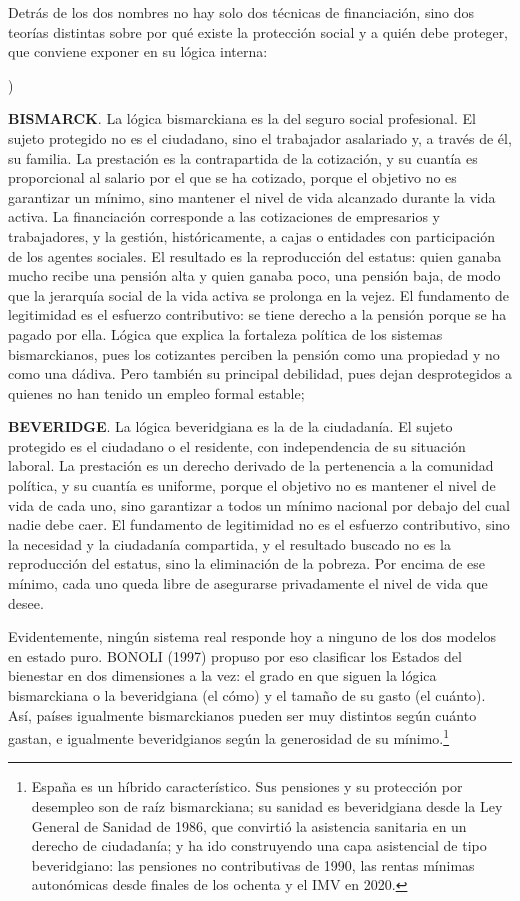 \documentclass[10pt,a4paper]{article}
\newcounter{alphaitem}
\newenvironment{la}
      {\begin{list}{\alph{alphaitem})}{%
          \usecounter{alphaitem}%
          \setlength{\leftmargin}{1cm}%
          \setlength{\parskip}{3pt}%
          \setlength{\itemsep}{0pt}%
          \setlength{\parsep}{0pt}%
      }}
      {\end{list}}
\begin{document}
Detrás de los dos nombres no hay solo dos técnicas de financiación, sino dos teorías distintas sobre por qué existe la protección social y a quién debe proteger, que conviene exponer en su lógica interna:
\begin{la}
    \item \textbf{BISMARCK}. La lógica bismarckiana es la del seguro social profesional. El sujeto protegido no es el ciudadano, sino el trabajador asalariado y, a través de él, su familia. La prestación es la contrapartida de la cotización, y su cuantía es proporcional al salario por el que se ha cotizado, porque el objetivo no es garantizar un mínimo, sino mantener el nivel de vida alcanzado durante la vida activa. La financiación corresponde a las cotizaciones de empresarios y trabajadores, y la gestión, históricamente, a cajas o entidades con participación de los agentes sociales. El resultado es la reproducción del estatus: quien ganaba mucho recibe una pensión alta y quien ganaba poco, una pensión baja, de modo que la jerarquía social de la vida activa se prolonga en la vejez. El fundamento de legitimidad es el esfuerzo contributivo: se tiene derecho a la pensión porque se ha pagado por ella. Lógica que explica la fortaleza política de los sistemas bismarckianos, pues los cotizantes perciben la pensión como una propiedad y no como una dádiva. Pero también su principal debilidad, pues dejan desprotegidos a quienes no han tenido un empleo formal estable;
    \item \textbf{BEVERIDGE}. La lógica beveridgiana es la de la ciudadanía. El sujeto protegido es el ciudadano o el residente, con independencia de su situación laboral. La prestación es un derecho derivado de la pertenencia a la comunidad política, y su cuantía es uniforme, porque el objetivo no es mantener el nivel de vida de cada uno, sino garantizar a todos un mínimo nacional por debajo del cual nadie debe caer. El fundamento de legitimidad no es el esfuerzo contributivo, sino la necesidad y la ciudadanía compartida, y el resultado buscado no es la reproducción del estatus, sino la eliminación de la pobreza. Por encima de ese mínimo, cada uno queda libre de asegurarse privadamente el nivel de vida que desee.
\end{la}

Evidentemente, ningún sistema real responde hoy a ninguno de los dos modelos en estado puro. BONOLI (1997) propuso por eso clasificar los Estados del bienestar en dos dimensiones a la vez: el grado en que siguen la lógica bismarckiana o la beveridgiana (el cómo) y el tamaño de su gasto (el cuánto). Así, países igualmente bismarckianos pueden ser muy distintos según cuánto gastan, e igualmente beveridgianos según la generosidad de su mínimo.\footnote{%
    España es un híbrido característico. Sus pensiones y su protección por desempleo son de raíz bismarckiana; su sanidad es beveridgiana desde la Ley General de Sanidad de 1986, que convirtió la asistencia sanitaria en un derecho de ciudadanía; y ha ido construyendo una capa asistencial de tipo beveridgiano: las pensiones no contributivas de 1990, las rentas mínimas autonómicas desde finales de los ochenta y el IMV en 2020.
}
\end{document}
